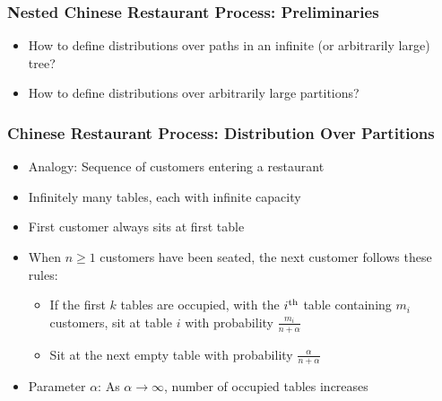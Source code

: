 \begin{frame}
\frametitle{Nested Chinese Restaurant Process: Preliminaries}
\begin{itemize}[<+->]
\item How to define distributions over paths in an infinite (or arbitrarily large) tree? \\
\item How to define distributions over arbitrarily large partitions? \\
\end{itemize}
\end{frame}

\begin{frame}
\frametitle{Chinese Restaurant Process: Distribution Over Partitions}
\begin{itemize}[<+->]
\item Analogy: Sequence of customers entering a restaurant
\item Infinitely many tables, each with infinite capacity
\item First customer always sits at first table
\item When $n \geq 1$ customers have been seated, the next customer follows these rules:
    \begin{itemize}
    \item If the first $k$ tables are occupied, with the $i^{\text{th}}$ table containing $m_i$ customers, sit at table $i$ with probability $\frac{m_i}{n+\alpha}$
    \item Sit at the next empty table with probability $\frac{\alpha}{n + \alpha}$
    \end{itemize}
\item Parameter $\alpha$: As $\alpha \to \infty$, number of occupied tables increases
\end{itemize}
\end{frame}

